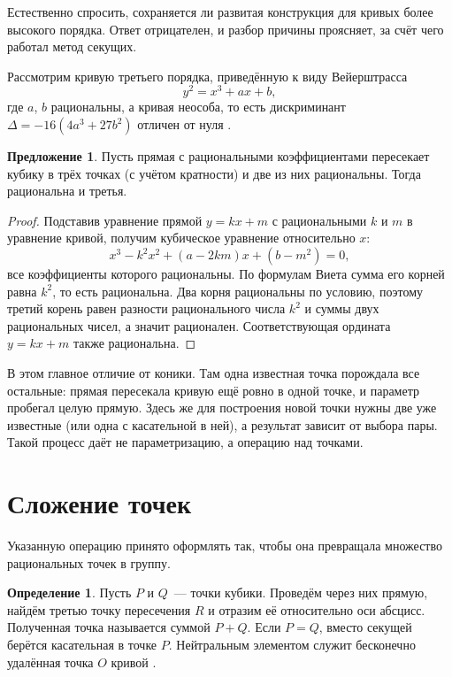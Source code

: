 \documentclass[a4paper,14pt]{extreport}
\theoremstyle{definition}
\newtheorem{defn}[thm]{Определение}
\newtheorem{prop}[thm]{Предложение}
\begin{document}
Естественно спросить, сохраняется ли развитая конструкция для кривых более
высокого порядка. Ответ отрицателен, и разбор причины проясняет, за счёт чего
работал метод секущих.

Рассмотрим кривую третьего порядка, приведённую к виду Вейерштрасса
\[
  y^2=x^3+ax+b,
\]
где $a$, $b$ рациональны, а кривая неособа, то есть дискриминант
$\Delta=-16(4a^3+27b^2)$ отличен от нуля \cite[гл.~I, \S~3]{silverman}.

\begin{prop}\label{prop:third}
Пусть прямая с рациональными коэффициентами пересекает кубику в трёх точках
(с учётом кратности) и две из них рациональны. Тогда рациональна и третья.
\end{prop}

\begin{proof}
Подставив уравнение прямой $y=kx+m$ с рациональными $k$ и $m$ в уравнение
кривой, получим кубическое уравнение относительно $x$:
\[
  x^3-k^2x^2+(a-2km)x+(b-m^2)=0,
\]
все коэффициенты которого рациональны. По формулам Виета сумма его корней равна
$k^2$, то есть рациональна. Два корня рациональны по условию, поэтому третий
корень равен разности рационального числа $k^2$ и суммы двух рациональных
чисел, а значит рационален. Соответствующая ордината $y=kx+m$ также рациональна.
\end{proof}

В этом главное отличие от коники. Там одна известная точка порождала все
остальные: прямая пересекала кривую ещё ровно в одной точке, и параметр пробегал
целую прямую. Здесь же для построения новой точки нужны две уже известные (или
одна с касательной в ней), а результат зависит от выбора пары. Такой процесс даёт
не параметризацию, а операцию над точками.

\section{Сложение точек}

Указанную операцию принято оформлять так, чтобы она превращала множество
рациональных точек в группу.

\begin{defn}\label{def:add}
Пусть $P$ и $Q$~--- точки кубики. Проведём через них прямую, найдём третью точку
пересечения $R$ и отразим её относительно оси абсцисс. Полученная точка
называется суммой $P+Q$. Если $P=Q$, вместо секущей берётся касательная в точке
$P$. Нейтральным элементом служит бесконечно удалённая точка $O$ кривой
\cite[гл.~I, \S~2]{silverman}.
\end{defn}
\end{document}
